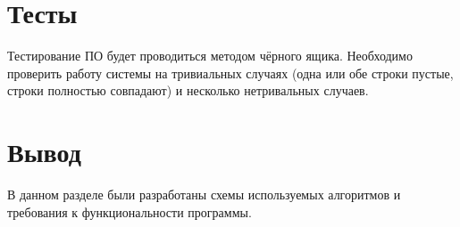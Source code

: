     \section{Тесты}
    Тестирование ПО будет проводиться методом чёрного ящика. Необходимо проверить работу системы 
    на тривиальных случаях (одна или обе строки пустые, строки полностью совпадают) 
    и несколько нетривальных случаев.
  	

	\section*{Вывод}


	В данном разделе были разработаны схемы используемых алгоритмов и требования к функциональности программы.
\newpage